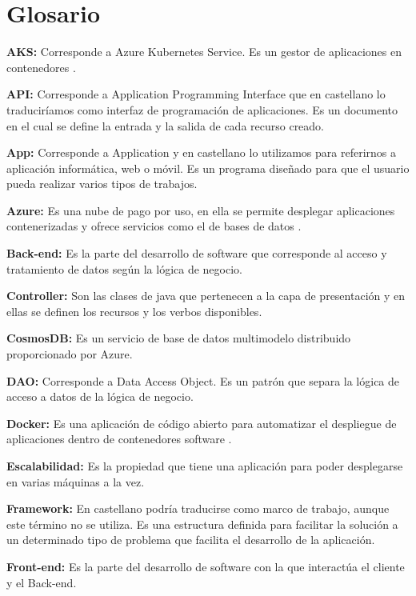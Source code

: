 \documentclass[12pt]{report} %
\begin{document}
	
\chapter*{Glosario}

\setcounter{page}{7}

\textbf{AKS:} Corresponde a Azure Kubernetes Service. Es un gestor de aplicaciones en contenedores \cite{kubernetes}.

\textbf{API:} Corresponde a Application Programming Interface que en castellano lo traduciríamos como interfaz de programación de aplicaciones. Es un documento en el cual se define la entrada y la salida de cada recurso creado.

\textbf{App:} Corresponde a Application y en castellano lo utilizamos para referirnos a aplicación informática, web o móvil. Es un programa diseñado para que el usuario pueda realizar varios tipos de trabajos.

\textbf{Azure:} Es una nube de pago por uso, en ella se permite desplegar aplicaciones contenerizadas y ofrece servicios como el de bases de datos \cite{Azure}. 

\textbf{Back-end:} Es la parte del desarrollo de software que corresponde al acceso y tratamiento de datos según la lógica de negocio.

\textbf{Controller:} Son las clases de java que pertenecen a la capa de presentación y en ellas se definen los recursos y los verbos disponibles.

\textbf{CosmosDB:} Es un servicio de base de datos multimodelo distribuido proporcionado por Azure.

\textbf{DAO:} Corresponde a Data Access Object. Es un patrón que separa la lógica de acceso a datos de la lógica de negocio.

\textbf{Docker:} Es una aplicación de código abierto para automatizar el despliegue de aplicaciones dentro de contenedores software \cite{Docker}.

\textbf{Escalabilidad:} Es la propiedad que tiene una aplicación para poder desplegarse en varias máquinas a la vez.

\textbf{Framework:} En castellano podría traducirse como marco de trabajo, aunque este término no se utiliza. Es una estructura definida para facilitar la solución a un determinado tipo de problema que facilita el desarrollo de la aplicación. 

\textbf{Front-end:} Es la parte del desarrollo de software con la que interactúa el cliente y el Back-end.
\end{document}
